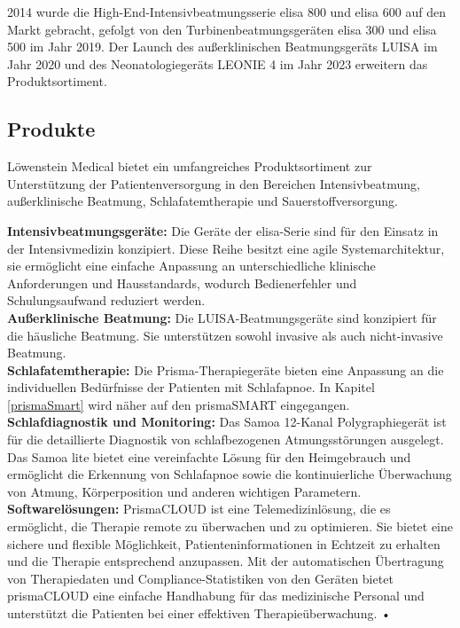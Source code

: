 \documentclass[a4paper, 12pt]{article}
\begin{document}
2014 wurde die High-End-Intensivbeatmungsserie elisa 800 und elisa 600 auf den Markt gebracht, gefolgt von den Turbinenbeatmungsgeräten elisa 300 und elisa 500 im Jahr 2019. Der Launch des außerklinischen Beatmungsgeräts LUISA im Jahr 2020 und des Neonatologiegeräts LEONIE 4 im Jahr 2023 erweitern das Produktsortiment. \cite{loewenstein}

\subsection{Produkte}\label{products} 
Löwenstein Medical bietet ein umfangreiches Produktsortiment zur Unterstützung der Patientenversorgung in den Bereichen Intensivbeatmung, außerklinische Beatmung, Schlafatemtherapie und Sauerstoffversorgung. 

\textbf{Intensivbeatmungsgeräte:} Die Geräte der elisa-Serie sind für den Einsatz in der Intensivmedizin konzipiert. Diese Reihe besitzt eine agile Systemarchitektur, sie ermöglicht eine einfache Anpassung an unterschiedliche klinische Anforderungen und Hausstandards, wodurch Bedienerfehler und Schulungsaufwand reduziert werden. \\

\textbf{Außerklinische Beatmung:} Die LUISA-Beatmungsgeräte sind konzipiert für die häusliche Beatmung. Sie unterstützen sowohl invasive als auch nicht-invasive Beatmung. \\

\textbf{Schlafatemtherapie:} Die Prisma-Therapiegeräte bieten eine Anpassung an die individuellen Bedürfnisse der Patienten mit Schlafapnoe. In Kapitel \ref{prismaSmart} wird näher auf den prismaSMART eingegangen. \\

\textbf{Schlafdiagnostik und Monitoring:} Das Samoa 12-Kanal Polygraphiegerät ist für die detaillierte Diagnostik von schlafbezogenen Atmungsstörungen ausgelegt. Das Samoa lite bietet eine vereinfachte Lösung für den Heimgebrauch und ermöglicht die Erkennung von Schlafapnoe sowie die kontinuierliche Überwachung von Atmung, Körperposition und anderen wichtigen Parametern. \\

\textbf{Softwarelösungen:} PrismaCLOUD ist eine Telemedizinlösung, die es ermöglicht, die Therapie remote zu überwachen und zu optimieren. Sie bietet eine sichere und flexible Möglichkeit, Patienteninformationen in Echtzeit zu erhalten und die Therapie entsprechend anzupassen. Mit der automatischen Übertragung von Therapiedaten und Compliance-Statistiken von den Geräten bietet prismaCLOUD eine einfache Handhabung für das medizinische Personal und unterstützt die Patienten bei einer effektiven Therapieüberwachung.
\textsc{•}%
\end{document}
